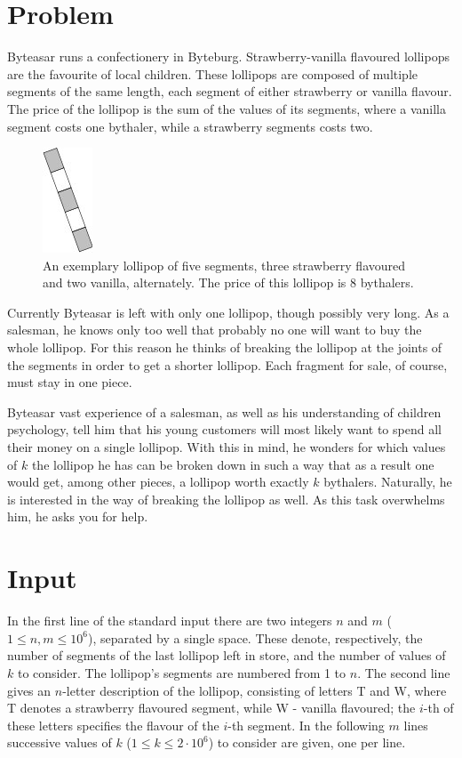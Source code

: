 \documentclass[11pt]{article}
\begin{document}
\section*{Problem}
Byteasar runs a confectionery in Byteburg. Strawberry-vanilla flavoured lollipops are the favourite of local children. These lollipops are composed of multiple segments of the same length, each segment of either strawberry or vanilla flavour. The price of the lollipop is the sum of the values of its segments, where a vanilla segment costs one bythaler, while a strawberry segments costs two.

\begin{figure}
\begin{center}
\includegraphics{Lollipop.jpg}
\end{center}

\caption{An exemplary lollipop of five segments, three strawberry flavoured and two vanilla, alternately. The price of this lollipop is $8$ bythalers.}
\end{figure}


Currently Byteasar is left with only one lollipop, though possibly very long. As a salesman, he knows only too well that probably no one will want to buy the whole lollipop. For this reason he thinks of breaking the lollipop at the joints of the segments in order to get a shorter lollipop. Each fragment for sale, of course, must stay in one piece.

Byteasar vast experience of a salesman, as well as his understanding of children psychology, tell him that his young customers will most likely want to spend all their money on a single lollipop. With this in mind, he wonders for which values of $k$ the lollipop he has can be broken down in such a way that as a result one would get, among other pieces, a lollipop worth exactly $k$ bythalers. Naturally, he is interested in the way of breaking the lollipop as well. As this task overwhelms him, he asks you for help. 
\section*{Input}
In the first line of the standard input there are two integers $n$ and $m$ ($1\le n, m \le 10^6$), separated by a single space. These denote, respectively, the number of segments of the last lollipop left in store, and the number of values of $k$ to consider. The lollipop's segments are numbered from 1 to $n$. The second line gives an $n$-letter description of the lollipop, consisting of letters T and W, where T denotes a strawberry flavoured segment, while W - vanilla flavoured; the $i$-th of these letters specifies the flavour of the $i$-th segment. In the following $m$ lines successive values of $k$ ($1\le k\le 2\cdot 10^6$) to consider are given, one per line. 
\end{document}
